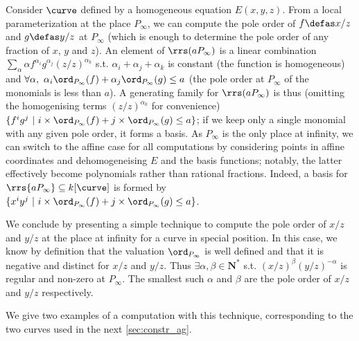 Consider $\curve$ defined by a homogeneous equation $E(x,y,z)$. From a local parameterization at the place $P_\infty$, we can compute the pole order of
$f \defas x/z$ and $g \defas y/z$ at $P_\infty$ (which is enough to determine the pole
order of any fraction of $x$, $y$ and $z$).
An element of $\rrs(aP_\infty)$ is a linear combination $\sum_\alpha \alpha f^{\alpha_i}g^{\alpha_j}(z/z)^{\alpha_k}$ s.t. $\alpha_i + \alpha_j + \alpha_k$ is constant (the function is
homogeneous) and $\forall \alpha,~\alpha_i\ord_{P_\infty}(f) + \alpha_j\ord_{P_\infty}(g) \leq a$ (the pole order at $P_\infty$ of the monomials is less
than $a$).
A generating family for $\rrs(aP_\infty)$ is thus (omitting the homogenising terms $(z/z)^{\alpha_k}$ for convenience) $\{f^ig^j~|~i\times\ord_{P_\infty}(f) + j\times\ord_{P_\infty}(g) \leq a\}$; if we keep only a single monomial
with any given pole order, it forms a basis.
As $P_\infty$ is the only place at infinity, we can switch to the affine case for all computations by considering points in affine coordinates and dehomogeneising $E$ and the basis functions; notably, the latter effectively become polynomials rather
than rational fractions. Indeed, a basis for $\rrs{aP_\infty} \subseteq k[\curve]$ is formed by $\{x^iy^j~|~i\times\ord_{P_\infty}(f) + j\times\ord_{P_\infty}(g) \leq a\}$.

\medskip

We conclude by presenting a simple technique to compute the pole order of $x/z$ and $y/z$ at the place at infinity for a curve in special position.
In this case, we know by definition that the valuation $\ord_{P_\infty}$ is well defined and that it is negative and distinct for $x/z$ and $y/z$.
Thus $\exists \alpha,\beta \in \mathbf{N}^*$ s.t. $(x/z)^\beta(y/z)^{-\alpha}$ is regular and non-zero at $P_\infty$. The smallest such $\alpha$
and $\beta$ are the pole order of $x/z$ and $y/z$ respectively.

We give two examples of a computation with this technique, corresponding to the two curves used in the next \autoref{sec:constr_ag}.

